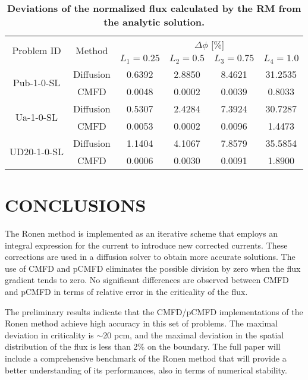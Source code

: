 \documentclass[letterpaper]{mc2021}
\begin{document}
\vspace{-5.0mm}
\begin{table}[htb]
	\vspace{-5.5mm}
	\centering
	\caption{\bf Deviations of the normalized flux calculated by the RM from the analytic solution.}
	\label{table:res2} 
	\small
	\begin{tabular}{|c|c|c|c|c|c|} \hline 
	\multirow{2}{*}{Problem ID} & \multirow{2}{*}{Method} & \multicolumn{4}{c|}{$\Delta\phi$ [\%]}  \\
	\cline{3-6}
	& & $L_1 = 0.25$ & $L_2 = 0.5$ & $L_3 = 0.75$ & $L_4 = 1.0$  \\
	\hline
	\multirow{2}{*}{Pub-1-0-SL} & Diffusion  & 0.6392 & 2.8850 & 8.4621 & 31.2535  \\
	\cline{2-6}
	$(I=100)$ & CMFD 	     & 0.0048 & 0.0002 & 0.0039 & 0.8033  \\ \hline
	\multirow{2}{*}{Ua-1-0-SL}  & Diffusion  & 0.5307 & 2.4284 & 7.3924 & 30.7287 \\
	\cline{2-6} 
	$(I=100)$ & CMFD       & 0.0053 & 0.0002 & 0.0096 & 1.4473  \\ \hline 
	\multirow{2}{*}{UD20-1-0-SL} & Diffusion & 1.1404 & 4.1067 & 7.8579 & 35.5854  \\ 
	\cline{2-6} 		
	$(I=200)$& CMFD      & 0.0006 & 0.0030 & 0.0091 & 1.8900  \\ \hline 		
\end{tabular}
\vspace{-5.0mm}
\end{table}

\vspace{-6.5mm}

\section{CONCLUSIONS}

The Ronen method is implemented as an iterative scheme that employs an integral expression for the current to introduce new corrected currents. These corrections are used in a diffusion solver to obtain more accurate solutions. The use of CMFD and pCMFD eliminates the possible division by zero when the flux gradient tends to zero. No significant differences are observed between CMFD and pCMFD in terms of relative error in the criticality of the flux. 

\vspace{-1.5mm}

The preliminary results indicate that the CMFD/pCMFD implementations of the Ronen method achieve high accuracy in this set of problems. The maximal deviation in criticality is $\sim$20 pcm, and the maximal deviation in the spatial distribution of the flux is less than 2\% on the boundary.  
%
The full paper will include a comprehensive benchmark of the Ronen method that will provide a better understanding of its performances, also in terms of numerical stability.
\end{document}
